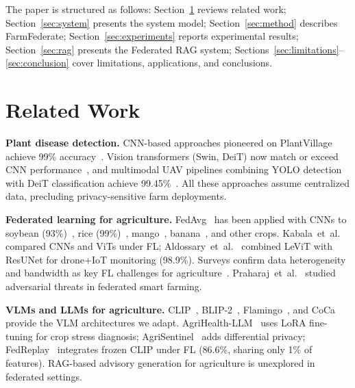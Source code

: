 \documentclass[10pt,journal,compsoc]{IEEEtran}
\begin{document}
The paper is structured as follows: Section~\ref{sec:related} reviews related work; Section~\ref{sec:system} presents the system model; Section~\ref{sec:method} describes FarmFederate; Section~\ref{sec:experiments} reports experimental results; Section~\ref{sec:rag} presents the Federated RAG system; Sections~\ref{sec:limitations}--\ref{sec:conclusion} cover limitations, applications, and conclusions.

\section{Related Work}
\label{sec:related}

\textbf{Plant disease detection.} CNN-based approaches pioneered on PlantVillage achieve 99\% accuracy~\cite{mohanty2016using,ferentinos2018deep}. Vision transformers (Swin, DeiT) now match or exceed CNN performance~\cite{fahimulislam2024wheat,zhang2025swin}, and multimodal UAV pipelines combining YOLO detection with DeiT classification achieve 99.45\%~\cite{alobeidat2025multimodal}. All these approaches assume centralized data, precluding privacy-sensitive farm deployments.

\textbf{Federated learning for agriculture.} FedAvg~\cite{mcmahan2017communication} has been applied with CNNs to soybean (93\%)~\cite{kumar2024soybean}, rice (99\%)~\cite{aggarwal2023rice}, mango~\cite{mehta2024mango}, banana~\cite{sharma2024banana}, and other crops. Kabala~et~al.~\cite{kabala2023image} compared CNNs and ViTs under FL; Aldossary~et~al.~\cite{aldossary2025levit} combined LeViT with ResUNet for drone+IoT monitoring (98.9\%). Surveys confirm data heterogeneity and bandwidth as key FL challenges for agriculture~\cite{kondaveeti2024fl,belghachi2025fl,puppala2026satellite}. Praharaj~et~al.~\cite{praharaj2025adversarial} studied adversarial threats in federated smart farming.

\textbf{VLMs and LLMs for agriculture.} CLIP~\cite{radford2021learning}, BLIP-2~\cite{li2023blip}, Flamingo~\cite{alayrac2022flamingo}, and CoCa~\cite{yu2022coca} provide the VLM architectures we adapt. AgriHealth-LLM~\cite{long2025agrihealth} uses LoRA fine-tuning for crop stress diagnosis; AgriSentinel~\cite{xu2025agrisentinel} adds differential privacy; FedReplay~\cite{li2025fedreplay} integrates frozen CLIP under FL (86.6\%, sharing only 1\% of features). RAG-based advisory generation for agriculture is unexplored in federated settings.
\end{document}
